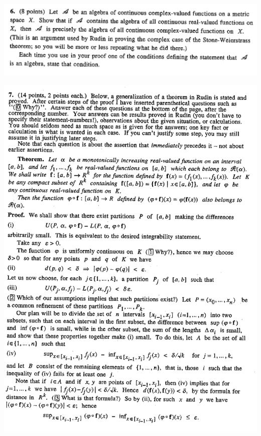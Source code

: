 \includegraphics[width=400pt]{img/analysis--berkeley-104-final--spring-2006-3cc8.png}




\includegraphics[width=400pt]{img/analysis--berkeley-104-final--spring-2006-b835.png}


